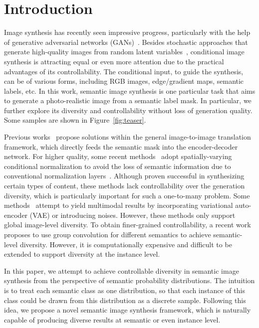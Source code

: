 \documentclass[final]{cvpr}
\begin{document}
\section{Introduction}
Image synthesis has recently seen impressive progress, particularly with the help of generative adversarial networks (GANs)~\cite{goodfellow2014generative}. Besides stochastic approaches that generate high-quality images from random latent variables~\cite{karras2019style,karras2020analyzing}, conditional image synthesis is attracting equal or even more attention due to the practical advantages of its controllability. The conditional input, to guide the synthesis, can be of various forms, including RGB images, edge/gradient maps, semantic labels, etc. In this work, semantic image synthesis is one particular task that aims to generate a photo-realistic image from a semantic label mask. In particular, we further explore its diversity and controllability without loss of generation quality. Some samples are shown in Figure~\ref{fig:teaser}.

Previous works~\cite{isola2017image,wang2018high} propose solutions within the general image-to-image translation framework, which directly feeds the semantic mask into the encoder-decoder network. For higher quality, some recent methods~\cite{park2019semantic,zhu2020sean,tan2020michigan} adopt spatially-varying conditional normalization to avoid the loss of semantic information due to conventional normalization layers~\cite{ulyanov2016instance}. Although proven successful in synthesizing certain types of content, these methods lack controllability over the generation diversity, which is particularly important for such a one-to-many problem. Some methods~\cite{zhu2017toward,yang2018diversity} attempt to yield multimodal results by incorporating variational auto-encoder (VAE) or introducing noises. However, these methods only support global image-level diversity.
To obtain finer-grained controllability, a recent work~\cite{zhu2020semantically} proposes to use group convolution for different semantics to achieve semantic-level diversity. However, it is computationally expensive and difficult to be extended to support diversity at the instance level.

In this paper, we attempt to achieve controllable diversity in semantic image synthesis from the perspective of semantic probability distributions. The intuition is to treat each semantic class as one distribution, so that each instance of this class could be drawn from this distribution as a discrete sample. Following this idea, we propose a novel semantic image synthesis framework, which is naturally capable of producing diverse results at semantic or even instance level.
\end{document}
